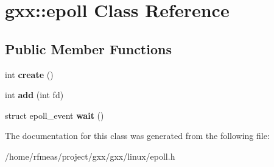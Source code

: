 \hypertarget{classgxx_1_1epoll}{}\section{gxx\+:\+:epoll Class Reference}
\label{classgxx_1_1epoll}
\subsection*{Public Member Functions}
\begin{DoxyCompactItemize}
\item 
int {\bfseries create} ()\hypertarget{classgxx_1_1epoll_a58ddec28b099368ccf8c36061feedce8}{}\label{classgxx_1_1epoll_a58ddec28b099368ccf8c36061feedce8}

\item 
int {\bfseries add} (int fd)\hypertarget{classgxx_1_1epoll_af2122f8e1fb08b1be950128575718c20}{}\label{classgxx_1_1epoll_af2122f8e1fb08b1be950128575718c20}

\item 
struct epoll\+\_\+event {\bfseries wait} ()\hypertarget{classgxx_1_1epoll_a15fc16cb3567f3223267f2c416a16dc6}{}\label{classgxx_1_1epoll_a15fc16cb3567f3223267f2c416a16dc6}

\end{DoxyCompactItemize}


The documentation for this class was generated from the following file\+:\begin{DoxyCompactItemize}
\item 
/home/rfmeas/project/gxx/gxx/linux/epoll.\+h\end{DoxyCompactItemize}
